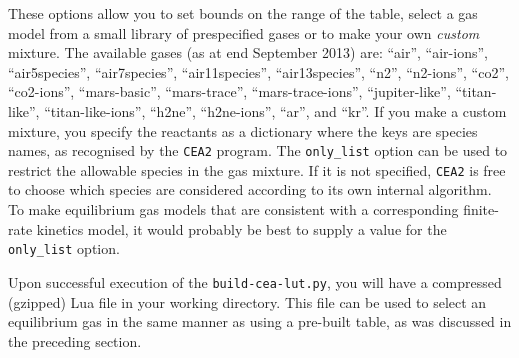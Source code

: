 \medskip
These options allow you to set bounds on the range of the table,
select a gas model from a small library of prespecified gases or
to make your own \textit{custom} mixture.
The available gases (as at end September 2013) are:
   ``air'',
   ``air-ions'',
   ``air5species'',
   ``air7species'',
   ``air11species'',
   ``air13species'',
   ``n2'',
   ``n2-ions'',
   ``co2'',
   ``co2-ions'',
   ``mars-basic'',
   ``mars-trace'',
   ``mars-trace-ions'',
   ``jupiter-like'',
   ``titan-like'',
   ``titan-like-ions'',
   ``h2ne'',
   ``h2ne-ions'',
   ``ar'', and ``kr''.
If you make a custom mixture, you specify the reactants as a dictionary where the keys are
species names, as recognised by the \verb!CEA2! program.
The \verb!only_list! option can be used to restrict the allowable species in the gas mixture.
If it is not specified, \verb!CEA2! is free to choose which species are considered according to its
own internal algorithm.
To make equilibrium gas models that are consistent with a corresponding finite-rate kinetics model,
it would probably be best to supply a value for the \verb!only_list! option.

\medskip
Upon successful execution of the \texttt{build-cea-lut.py}, you will have a compressed (gzipped)
Lua file in your working directory.
This file can be used to select an equilibrium gas in the
same manner as using a pre-built table, as was discussed in the preceding section. 

